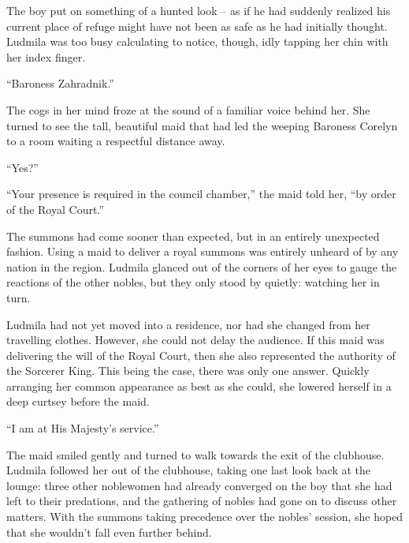  

The boy put on something of a hunted look – as if he had suddenly realized his current place of refuge might have not been as safe as he had initially thought. Ludmila was too busy calculating to notice, though, idly tapping her chin with her index finger.

 

“Baroness Zahradnik.”

 

The cogs in her mind froze at the sound of a familiar voice behind her. She turned to see the tall, beautiful maid that had led the weeping Baroness Corelyn to a room waiting a respectful distance away.

 

“Yes?”

 

“Your presence is required in the council chamber,” the maid told her, “by order of the Royal Court.”

 

The summons had come sooner than expected, but in an entirely unexpected fashion. Using a maid to deliver a royal summons was entirely unheard of by any nation in the region. Ludmila glanced out of the corners of her eyes to gauge the reactions of the other nobles, but they only stood by quietly: watching her in turn.

 

Ludmila had not yet moved into a residence, nor had she changed from her travelling clothes. However, she could not delay the audience. If this maid was delivering the will of the Royal Court, then she also represented the authority of the Sorcerer King. This being the case, there was only one answer. Quickly arranging her common appearance as best as she could, she lowered herself in a deep curtsey before the maid.

 

“I am at His Majesty’s service.”

 

The maid smiled gently and turned to walk towards the exit of the clubhouse. Ludmila followed her out of the clubhouse, taking one last look back at the lounge: three other noblewomen had already converged on the boy that she had left to their predations, and the gathering of nobles had gone on to discuss other matters. With the summons taking precedence over the nobles’ session, she hoped that she wouldn’t fall even further behind.